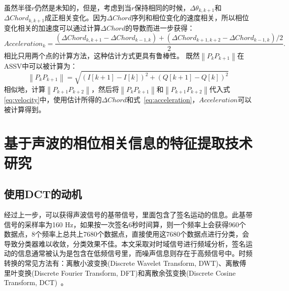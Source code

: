 虽然半径$r$仍然是未知的，但是，考虑到当$r$保持相同的时候，$\Delta \theta_{k,k+1}$和$\Delta Chord_{k,k+1}$成正相关变化。因为$\Delta Chord$序列和相位变化的速度相关，所以相位变化相关的加速度可以通过计算$\Delta Chord$的导数而进一步获得：
\begin{equation}
Acceleration_{k} = \frac{\left( \Delta Chord_{k,k+1} - \Delta Chord_{k-1,k} \right) + \left( \Delta Chord_{k+1,k+2}- \Delta Chord_{k-1,k}\right)/2}{2}. \label{eq:acceleration}
\end{equation}
相比只用两个点的计算方法，这种估计方式更具有鲁棒性。
既然$\left\|P_{k}P_{k+1}\right\|$在ASSV中可以被计算为：
\begin{equation}
  \left\|P_{k}P_{k+1}\right\|= \sqrt{\left( I[k+1] - I[k] \right)^2 + \left( Q[k+1] - Q[k] \right)^2}
\end{equation}
相似地，计算$\left\|P_{k+1}P_{k+2}\right\|$，然后将$\left\|P_{k}P_{k+1}\right\|$和$\left\|P_{k+1}P_{k+2}\right\|$代入式\eqref{eq:velocity}中，使用估计所得的$\Delta Chord $和式~\eqref{eq:acceleration}，$Acceleration$可以被计算得到。



\section{基于声波的相位相关信息的特征提取技术研究}
\subsection{使用DCT的动机}
经过上一步，可以获得声波信号的基带信号，里面包含了签名运动的信息。此基带信号的采样率为160 Hz，如果按一次签名6秒时间算，则一个频率上会获得960个数据点，8个频率上总共上7680个数据点，直接使用这7680个数据点进行分类，会导致分类器难以收敛，分类效果不佳。本文采取对时域信号进行频域分析，签名运动的信息通常被认为是包含在低频信号里，而噪声信息则存在于高频信号中。时频转换的常见方法有：离散小波变换(Discrete Wavelet Transform, DWT)、离散傅里叶变换(Discrete Fourier Transform, DFT)和离散余弦变换(Discrete Cosine Transform, DCT)~\cite{安霄霄手写签名的多重数字水印及认证算法研究}。


